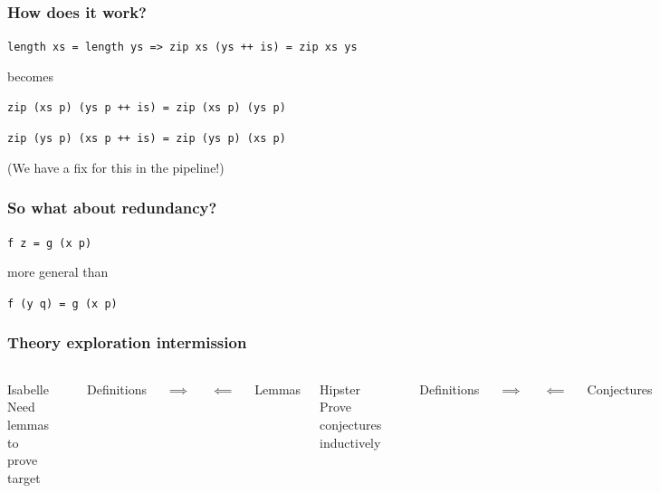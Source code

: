 \documentclass{beamer}
\begin{document}
\begin{frame}
    \frametitle{How does it work?}
        \centerline{\texttt{length xs = length ys => zip xs (ys ++ is) = zip xs ys}}
        \centerline{}
        \centerline{becomes}
        \centerline{}
        \centerline{\texttt{zip (xs p) (ys p ++ is) = zip (xs p) (ys p)}}
        \pause
        \centerline{}
        \centerline{\texttt{zip (ys p) (xs p ++ is) = zip (ys p) (xs p)}}
        \centerline{}
        \centerline{(We have a fix for this in the pipeline!)}
\end{frame}

\begin{frame}
    \frametitle{So what about redundancy?}
        \Large{\centerline{\texttt{f z = g (x p)}}}
        \centerline{}
        \centerline{more general than}
        \centerline{}
        \Large{\centerline{\texttt{f (y q) = g (x p)}}}
\end{frame}

\begin{frame}
    \frametitle{Theory exploration intermission}
    \begin{columns}
        \begin{block}{Isabelle}
            \small{Need lemmas to prove target}
        \end{block}

        \\
        \centerline{Definitions}
        \centerline{\Large{$\implies$}}
        \centerline{\Large{$\impliedby$}}
        \centerline{Lemmas}

        \begin{block}{Hipster}
            \small{Prove conjectures inductively}
        \end{block}
        
        \\
        \centerline{Definitions}
        \centerline{\Large{$\implies$}}
        \centerline{\Large{$\impliedby$}}
        \centerline{Conjectures}

        \begin{block}{QuickSpec}
            \small{Conjecture conjectures
            \\(we are here)}
        \end{block}

    \end{columns}
\end{frame}
\end{document}
